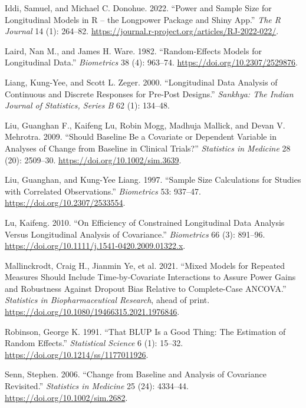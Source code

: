 \documentclass[
  11pt,
]{article}
\newlength{\cslhangindent}
\newenvironment{CSLReferences}[2] %
 {\begin{list}{}{%
  \setlength{\itemindent}{0pt}
  \setlength{\leftmargin}{0pt}
  \setlength{\parsep}{0pt}
  \ifodd #1
   \setlength{\leftmargin}{\cslhangindent}
   \setlength{\itemindent}{-1\cslhangindent}
  \fi
  \setlength{\itemsep}{#2\baselineskip}}}
 {\end{list}}
\begin{document}
\begin{CSLReferences}{1}{1}
Iddi, Samuel, and Michael C. Donohue. 2022. {``Power and Sample Size for
Longitudinal Models in {R} -- the Longpower Package and {Shiny} App.''}
\emph{The R Journal} 14 (1): 264--82.
\url{https://journal.r-project.org/articles/RJ-2022-022/}.

Laird, Nan M., and James H. Ware. 1982. {``Random-Effects Models for
Longitudinal Data.''} \emph{Biometrics} 38 (4): 963--74.
\url{https://doi.org/10.2307/2529876}.

Liang, Kung-Yee, and Scott L. Zeger. 2000. {``Longitudinal Data Analysis
of Continuous and Discrete Responses for Pre-Post Designs.''}
\emph{Sankhya: The Indian Journal of Statistics, Series B} 62 (1):
134--48.

Liu, Guanghan F., Kaifeng Lu, Robin Mogg, Madhuja Mallick, and Devan V.
Mehrotra. 2009. {``Should Baseline Be a Covariate or Dependent Variable
in Analyses of Change from Baseline in Clinical Trials?''}
\emph{Statistics in Medicine} 28 (20): 2509--30.
\url{https://doi.org/10.1002/sim.3639}.

Liu, Guanghan, and Kung-Yee Liang. 1997. {``Sample Size Calculations for
Studies with Correlated Observations.''} \emph{Biometrics} 53: 937--47.
\url{https://doi.org/10.2307/2533554}.

Lu, Kaifeng. 2010. {``On Efficiency of Constrained Longitudinal Data
Analysis Versus Longitudinal Analysis of Covariance.''}
\emph{Biometrics} 66 (3): 891--96.
\url{https://doi.org/10.1111/j.1541-0420.2009.01322.x}.

{Mallinckrodt, Craig H., Jianmin Ye, et al.} 2021. {``Mixed Models for
Repeated Measures Should Include Time-by-Covariate Interactions to
Assure Power Gains and Robustness Against Dropout Bias Relative to
Complete-Case {ANCOVA}.''} \emph{Statistics in Biopharmaceutical
Research}, ahead of print.
\url{https://doi.org/10.1080/19466315.2021.1976846}.

Robinson, George K. 1991. {``That {BLUP} Is a Good Thing: The Estimation
of Random Effects.''} \emph{Statistical Science} 6 (1): 15--32.
\url{https://doi.org/10.1214/ss/1177011926}.

Senn, Stephen. 2006. {``Change from Baseline and Analysis of Covariance
Revisited.''} \emph{Statistics in Medicine} 25 (24): 4334--44.
\url{https://doi.org/10.1002/sim.2682}.


\end{CSLReferences}
\end{document}
